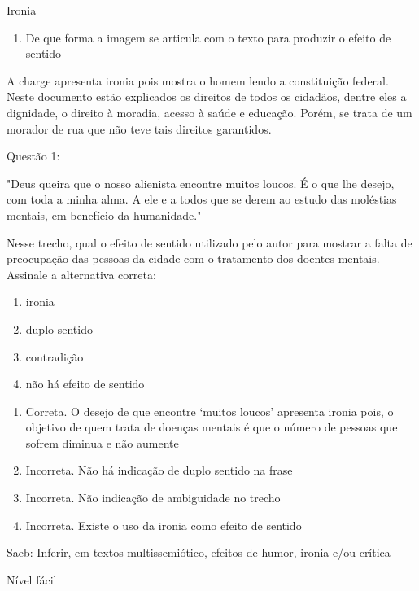 {Ironia

\begin{enumerate}
\def\labelenumi{\arabic{enumi})}
\setcounter{enumi}{9}
\tightlist
\item
  De que forma a imagem se articula com o texto para produzir o efeito
  de sentido
\end{enumerate}

A charge apresenta ironia pois mostra o homem lendo a constituição
federal. Neste documento estão explicados os direitos de todos os
cidadãos, dentre eles a dignidade, o direito à moradia, acesso à saúde e
educação. Porém, se trata de um morador de rua que não teve tais
direitos garantidos.


Questão 1:

"Deus queira que o nosso alienista encontre muitos loucos. É o que lhe
desejo, com toda a minha alma. A ele e a todos que se derem ao estudo
das moléstias mentais, em benefício da humanidade."

Nesse trecho, qual o efeito de sentido utilizado pelo autor para mostrar
a falta de preocupação das pessoas da cidade com o tratamento dos
doentes mentais. Assinale a alternativa correta:

\begin{enumerate}
\def\labelenumi{\alph{enumi})}
\item
  ironia
\item
  duplo sentido
\item
  contradição
\item
  não há efeito de sentido
\end{enumerate}

\begin{enumerate}
\def\labelenumi{\alph{enumi})}
\item
  Correta. O desejo de que encontre `muitos loucos' apresenta ironia
  pois, o objetivo de quem trata de doenças mentais é que o número de
  pessoas que sofrem diminua e não aumente
\item
  Incorreta. Não há indicação de duplo sentido na frase
\item
  Incorreta. Não indicação de ambiguidade no trecho
\item
  Incorreta. Existe o uso da ironia como efeito de sentido
\end{enumerate}

Saeb: Inferir, em textos multissemiótico, efeitos de humor, ironia e/ou
crítica

Nível fácil

}
